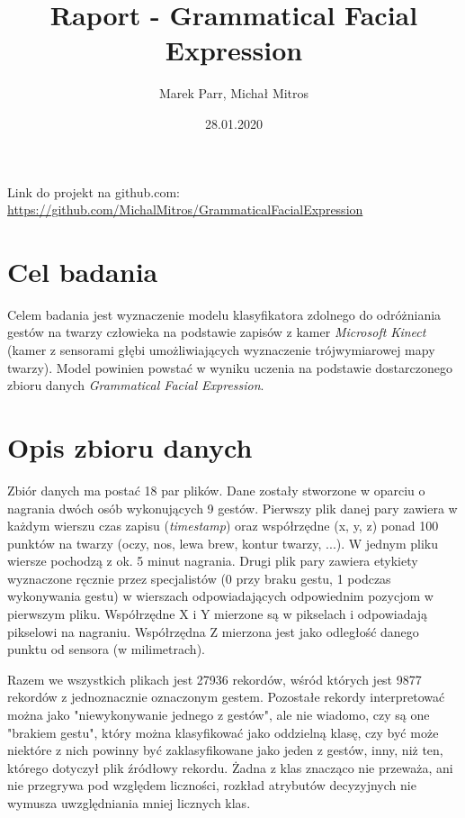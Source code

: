 \documentclass[a4paper,12pt]{article}
\begin{document}
\title{Raport - Grammatical Facial Expression}
\author{Marek Parr, Michał Mitros}
\date{28.01.2020}
\maketitle

\newpage
Link do projekt na github.com:\\
\href{https://github.com/MichalMitros/GrammaticalFacialExpression}{https://github.com/MichalMitros/GrammaticalFacialExpression}
\section{Cel badania}
\hspace{1cm}Celem badania jest wyznaczenie modelu klasyfikatora zdolnego do odróżniania gestów na twarzy człowieka na podstawie zapisów z kamer \textsl{Microsoft Kinect} (kamer z sensorami głębi umożliwiających wyznaczenie trójwymiarowej mapy twarzy). Model powinien powstać w wyniku uczenia na podstawie dostarczonego zbioru danych \textsl{Grammatical Facial Expression}.

\section{Opis zbioru danych}
\hspace{1cm}Zbiór danych ma postać 18 par plików. Dane zostały stworzone w oparciu o nagrania dwóch osób wykonujących 9 gestów. Pierwszy plik danej pary zawiera w każdym wierszu czas zapisu (\textsl{timestamp}) oraz współrzędne (x, y, z) ponad 100 punktów na twarzy (oczy, nos, lewa brew, kontur twarzy, ...). W jednym pliku wiersze pochodzą z ok. 5 minut nagrania. Drugi plik pary zawiera etykiety wyznaczone ręcznie przez specjalistów (0 przy braku gestu, 1 podczas wykonywania gestu) w wierszach odpowiadających odpowiednim pozycjom w pierwszym pliku.\newline
Współrzędne X i Y mierzone są w pikselach i odpowiadają pikselowi na nagraniu. Współrzędna Z mierzona jest jako odległość danego punktu od sensora (w milimetrach).\newline

\hspace{1cm}Razem we wszystkich plikach jest 27936 rekordów, wśród których jest 9877 rekordów z jednoznacznie oznaczonym gestem. Pozostałe rekordy interpretować można jako "niewykonywanie jednego z gestów", ale nie wiadomo, czy są one "brakiem gestu", który można klasyfikować jako oddzielną klasę, czy być może niektóre z nich powinny być zaklasyfikowane jako jeden z gestów, inny, niż ten, którego dotyczył plik źródłowy rekordu. Żadna z klas znacząco nie przeważa, ani nie przegrywa pod względem liczności, rozkład atrybutów decyzyjnych nie wymusza uwzględniania mniej licznych klas.
\end{document}
